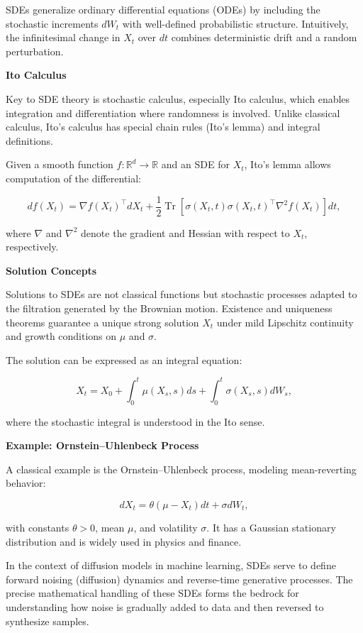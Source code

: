 SDEs generalize ordinary differential equations (ODEs) by including the stochastic increments \( dW_t \) with well-defined probabilistic structure. Intuitively, the infinitesimal change in \( X_t \) over \( dt \) combines deterministic drift and a random perturbation.

\textbf{Ito Calculus}

Key to SDE theory is stochastic calculus, especially Ito calculus, which enables integration and differentiation where randomness is involved. Unlike classical calculus, Ito's calculus has special chain rules (Ito's lemma) and integral definitions.

Given a smooth function \( f: \mathbb{R}^d \to \mathbb{R} \) and an SDE for \( X_t \), Ito's lemma allows computation of the differential:

\[
df(X_t) = \nabla f(X_t)^\top dX_t + \frac{1}{2} \operatorname{Tr}\left[\sigma(X_t, t) \sigma(X_t, t)^\top \nabla^2 f(X_t)\right] dt,
\]

where \( \nabla \) and \( \nabla^2 \) denote the gradient and Hessian with respect to \( X_t \), respectively.

\textbf{Solution Concepts}

Solutions to SDEs are not classical functions but stochastic processes adapted to the filtration generated by the Brownian motion. Existence and uniqueness theorems guarantee a unique strong solution \( X_t \) under mild Lipschitz continuity and growth conditions on \( \mu \) and \( \sigma \).

The solution can be expressed as an integral equation:

\[
X_t = X_0 + \int_0^t \mu(X_s, s) ds + \int_0^t \sigma(X_s, s) dW_s,
\]

where the stochastic integral is understood in the Ito sense.

\textbf{Example: Ornstein–Uhlenbeck Process}

A classical example is the Ornstein–Uhlenbeck process, modeling mean-reverting behavior:

\[
dX_t = \theta (\mu - X_t) dt + \sigma dW_t,
\]

with constants \( \theta > 0 \), mean \( \mu \), and volatility \( \sigma \). It has a Gaussian stationary distribution and is widely used in physics and finance.

In the context of diffusion models in machine learning, SDEs serve to define forward noising (diffusion) dynamics and reverse-time generative processes. The precise mathematical handling of these SDEs forms the bedrock for understanding how noise is gradually added to data and then reversed to synthesize samples.

